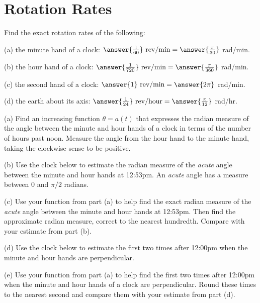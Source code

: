 \documentclass{ximera}
\begin{document}
\section{Rotation Rates}
\begin{question}  \label{Q245: Angles}
Find the exact rotation rates of the following:

(a) the minute hand of a clock: $\answer{\frac{1}{60}} \text{ rev/min} = \answer{\frac{\pi}{30}}$ rad/min. 

(b) the hour hand of a clock: $\answer{\frac{1}{720}} \text{ rev/min} =\answer{\frac{\pi}{360}}$ rad/min. 

(c) the second hand of a clock: $\answer{1} \text{ rev/min} =\answer{2\pi}$ rad/min. 

(d) the earth about its axis: $\answer{\frac{1}{24}} \text{ rev/hour} =\answer{\frac{\pi}{12}}$ rad/hr.

\end{question}


\begin{question}   \label{Q54: Angles}
(a) Find an increasing function $\theta = a(t)$ that expresses the radian measure of the angle between the minute and hour hands of a clock in terms of the number of hours past noon. Measure the angle from the hour hand to the minute hand, taking the clockwise sense to be positive. %

(b) Use the clock below to estimate the radian measure of the \emph{acute} angle between the minute and hour hands at 12:53pm. An \emph{acute} angle has a measure between $0$ and $\pi/2$ radians.

(c) Use your function from part (a) to help find the exact radian measure of the \emph{acute} angle between the minute and hour hands at 12:53pm. Then find the approximate radian measure, correct to the nearest hundredth. Compare with your estimate from part (b).

(d) Use the clock below to estimate the first two times after 12:00pm when the minute and hour hands are perpendicular.

(e) Use your function from part (a) to help find the first two times after 12:00pm when the minute and hour hands of a clock are perpendicular. Round these times to the nearest second and compare them with your estimate from part (d).

 
\begin{onlineOnly}
    \begin{center}
\end{center}
\end{onlineOnly}

\end{question}
\end{document}

